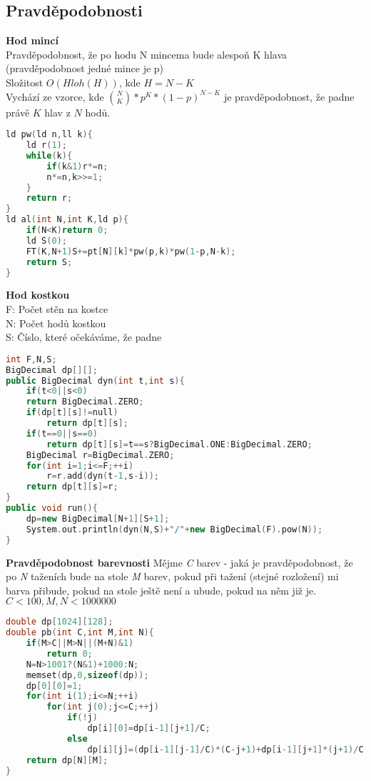 \documentclass[11pt]{article}
\begin{document}
\subsection{Pravděpodobnosti}
\textbf{Hod mincí}
\\Pravděpodobnost, že po hodu \textsf{N} mincema bude alespoň \textsf{K} hlava (pravděpodobnost jedné mince je \textsf{p})
\\Složitost $O(Hloh(H))$, kde $H=N-K$
\\Vychází ze vzorce, kde ${N\choose K}*p^K*(1-p)^{N-K}$ je pravděpodobnost, že padne právě $K$ hlav z $N$ hodů.
\begin{lstlisting}[language=C++]
ld pw(ld n,ll k){
    ld r(1);
    while(k){
        if(k&1)r*=n;
        n*=n,k>>=1;
    }
    return r;
}
ld al(int N,int K,ld p){
    if(N<K)return 0;
    ld S(0);
    FT(K,N+1)S+=pt[N][k]*pw(p,k)*pw(1-p,N-k);
    return S;
}
\end{lstlisting}
\textbf{Hod kostkou}
\\F: Počet stěn na kostce
\\N: Počet hodů kostkou
\\S: Číslo, které očekáváme, že padne
\begin{lstlisting}[language=C++]
int F,N,S;
BigDecimal dp[][];
public BigDecimal dyn(int t,int s){
    if(t<0||s<0)
    return BigDecimal.ZERO;
    if(dp[t][s]!=null)
        return dp[t][s];
    if(t==0||s==0)
        return dp[t][s]=t==s?BigDecimal.ONE:BigDecimal.ZERO;
    BigDecimal r=BigDecimal.ZERO;
    for(int i=1;i<=F;++i)
        r=r.add(dyn(t-1,s-i));
    return dp[t][s]=r;
} 
public void run(){
    dp=new BigDecimal[N+1][S+1];
    System.out.println(dyn(N,S)+"/"+new BigDecimal(F).pow(N));
}
\end{lstlisting}
\textbf{Pravděpodobnost barevnosti}
Mějme \textsl{C} barev - jaká je pravděpodobnost, že po \textsl{N} taženích bude na stole \textsl{M} barev, pokud při tažení (stejné rozložení) mi barva přibude, pokud na stole ještě není a ubude, pokud na něm již je. 
\\$C<100,{M,N}<1000000$
\begin{lstlisting}[language=C++]
double dp[1024][128];
double pb(int C,int M,int N){
    if(M>C||M>N||(M+N)&1)
        return 0;
    N=N>1001?(N&1)+1000:N;
    memset(dp,0,sizeof(dp));
    dp[0][0]=1;
    for(int i(1);i<=N;++i)
        for(int j(0);j<=C;++j)
            if(!j)
                dp[i][0]=dp[i-1][j+1]/C;
            else
                dp[i][j]=(dp[i-1][j-1]/C)*(C-j+1)+dp[i-1][j+1]*(j+1)/C;
    return dp[N][M];
}
\end{lstlisting}
\end{document}
